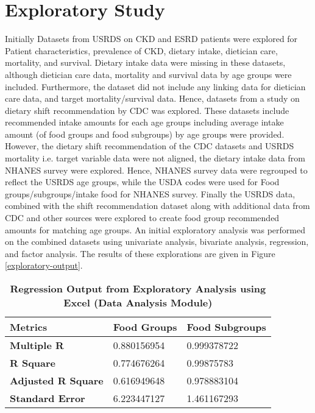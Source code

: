 \section{Exploratory Study}
Initially Datasets from USRDS on CKD and ESRD patients were explored for Patient characteristics, prevalence of CKD, dietary intake, dietician care, mortality, and survival. Dietary intake data were missing in these datasets, although dietician care data, mortality and survival data by age groups were included. Furthermore, the dataset did not include any linking data for dietician care data, and target mortality/survival data. Hence, datasets from a study on dietary shift recommendation by CDC was explored. These datasets include recommended intake amounts for each age groups including average intake amount (of food groups and food subgroups) by age groups were provided. However, the dietary shift recommendation of the CDC datasets and USRDS mortality i.e. target variable data were not aligned, the dietary intake data from NHANES survey were explored. Hence, NHANES survey data were regrouped to reflect the USRDS age groups, while the USDA codes were used for Food groups/subgroups/intake food for NHANES survey. Finally the USRDS data, combined with the shift recommendation dataset along with additional data from CDC and other sources were explored to create food group recommended amounts for matching age groups. An initial exploratory analysis was performed on the combined datasets using univariate analysis, bivariate analysis, regression, and factor analysis. The results of these explorations are given in Figure  \ref{exploratory-output}.

\begin{table}[!htb]
\caption{\textbf{Regression Output from Exploratory Analysis using Excel (Data Analysis Module)}}
\begin{tabular}{  | p{5 cm} | p{5 cm}  | p{5 cm} | }
\hline
   \textbf{Metrics} & \textbf{Food Groups} & \textbf{Food Subgroups} \\
\hline   
   \textbf{Multiple R}	& 0.880156954 & 0.999378722\\
\hline
\textbf{R Square}	& 0.774676264 & 0.99875783\\
\hline
\textbf{Adjusted R Square} &	0.616949648 &  0.978883104\\ 
\hline
\textbf{Standard Error}	& 6.223447127 & 1.461167293\\
\hline
\end{tabular}
\end{table}

